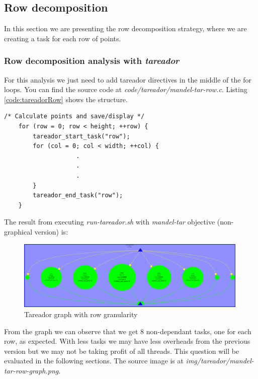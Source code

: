 \documentclass{article}
\begin{document}
\subsection{Row decomposition}
In this section we are presenting the row decomposition strategy, where we are creating a task for each row of points. 
\subsubsection*{Row decomposition analysis with \textit{tareador}}
For this analysis we just need to add tareador directives in the middle of the for loops. You can find the source code at \textit{code/tareador/mandel-tar-row.c}. Listing \ref{code:tareadorRow} shows the structure.

\begin{lstlisting}[caption={Tareador instrumentation at row granularity},label=code:tareadorRow]
    /* Calculate points and save/display */
    for (row = 0; row < height; ++row) {
        tareador_start_task("row");
        for (col = 0; col < width; ++col) {
                    .
                    .
                    .
        }
        tareador_end_task("row");       
    }
\end{lstlisting}
\begin{flushleft}
The result from executing \textit{run-tareador.sh} with \textit{mandel-tar} objective (non-graphical version) is:
\end{flushleft}
\begin{figure}[ht]
    \centering
    \includegraphics[width=0.99\textwidth]{mandel-tar-row-graph.png}
    \caption{Tareador graph with row granularity}
    \label{fig:tareadorrow}
\end{figure}

\begin{flushleft}
From the graph we can observe that we get 8 non-dependant tasks, one for each row, as expected. With less tasks we may have less overheads from the previous version but we may not be taking profit of all threads. This question will be evaluated in the following sections. The source image is at \textit{img/tareador/mandel-tar-row-graph.png}. 
\end{flushleft}
\newpage
\end{document}
